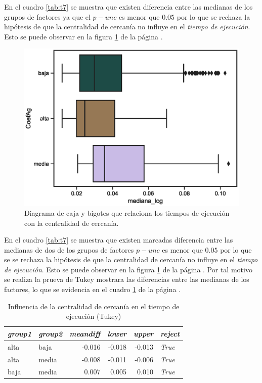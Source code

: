 \documentclass{article}
\begin{document}
En el cuadro \ref{tab:t7} se muestra que existen diferencia entre las medianas de los grupos de factores ya que el \emph{$p-unc$} es menor que $0.05$ por lo que se rechaza la hipótesis de que la centralidad de cercanía no influye en el \textit{tiempo de ejecución}. Esto se puede observar en la figura \ref{fig15} de la página \pageref{fig15}.

 \begin{center}
\begin{figure}[htbp]
\includegraphics[scale=0.6]{boxplot_CoefAg.eps}
\caption{Diagrama de caja y bigotes que relaciona los tiempos de ejecución con la centralidad de cercanía.}
\label{fig15}
\end{figure}
\end{center}

En el cuadro \ref{tab:t7} se muestra que existen marcadas diferencia entre las medianas de dos de los grupos de factores  \textbf{$p-unc$} es menor que $0.05$ por lo que se se rechaza la hipótesis de que la centralidad de cercanía no influye en el \textit{tiempo de ejecución}. Esto se puede observar en la figura \ref{fig15} de la página \pageref{fig15}. Por tal motivo se realiza la prueva de Tukey mostrara las diferencias entre las medianas de los factores, lo que se evidencia en el cuadro \ref{tab:t8} de la página \pageref{tab:t8}.
\begin{table}[htbp]
  \centering
  \caption{Influencia de la centralidad de cercanía en el tiempo de ejecución (Tukey)}
    \begin{tabular}{llrrrl}
    \toprule
    \textit{\textbf{group1}} & \textit{\textbf{group2}} & \multicolumn{1}{l}{\textit{\textbf{meandiff}}} & \multicolumn{1}{l}{\textit{\textbf{lower}}} & \multicolumn{1}{l}{\textit{\textbf{upper}}} & \textit{\textbf{reject}} \\
    \midrule
    alta  & baja  & -0.016 & -0.018 & -0.013 & \textit{True} \\
    alta  & media & -0.008 & -0.011 & -0.006 & \textit{True} \\
    baja  & media & 0.007 & 0.005 & 0.010 & \textit{True} \\
    \bottomrule
    \end{tabular}%
  \label{tab:t8}%
\end{table}%
\end{document}
